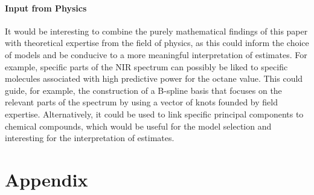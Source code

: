 \documentclass[11pt,twoside,a4paper]{article}
\begin{document}
	\paragraph{Input from Physics}
	It would be interesting to combine the purely mathematical findings of this paper with theoretical expertise from the field of physics, as this could inform the choice of models and be conducive to a more meaningful interpretation of estimates. For example, specific parts of the NIR spectrum can possibly be liked to specific molecules associated with high predictive power for the octane value. This could guide, for example, the construction of a B-spline basis that focuses on the relevant parts of the spectrum by using a vector of knots founded by field expertise. Alternatively, it could be used to link specific principal components to chemical compounds, which would be useful for the model selection and interesting for the interpretation of estimates.
	\vspace{-0.2cm}
	
	\nocite{James.2009} %
	
	\newpage
	\section{Appendix}
	
\end{document}
